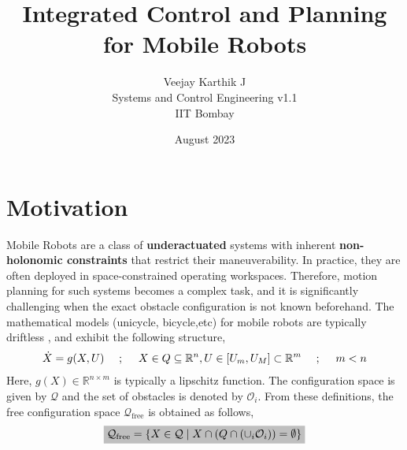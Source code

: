 \documentclass{article}
\begin{document}
\title{Integrated Control and Planning for Mobile Robots}
\author{Veejay Karthik J\\
Systems and Control Engineering v1.1\\
IIT Bombay}
\date{August 2023}


\maketitle

\section{Motivation}

Mobile Robots are a class of \textbf{underactuated} systems with inherent \textbf{non-holonomic constraints} that restrict their maneuverability. In practice, they are often deployed in space-constrained operating workspaces. Therefore, motion planning for such systems becomes a complex task, and it is significantly challenging when the exact obstacle configuration is not known beforehand. The mathematical models (unicycle, bicycle,etc) for mobile robots are typically driftless , and exhibit the following structure,
\begin{align}
\label{eqn:SystemDescription}
\centering
\dot{X} = g(X,U) \quad~;~\quad X \in Q \subseteq \mathbb{R}^n, U\in [U_m,U_M]\subset\mathbb{R}^m \quad~;~\quad m < n
\end{align}
Here, $g(X)\in \mathbb{R}^{n\times m}$ is typically a lipschitz function. The configuration space is given by $\mathcal{Q}$ and the set of obstacles is denoted by $\mathcal{O}_i$. From these definitions, the free configuration space $\mathcal{Q}_{\text{free}}$ is obtained as follows,
\begin{align}
\label{eqn:FreeWorkspaces}
\text{\colorbox{lightgray}{$\mathcal{Q}_{\text{free}} = \{X\in\mathcal{Q}\;|\; X\cap\left(Q\cap (\cup_i \mathcal{O}_i)\right) = \emptyset \}$}}
\end{align}
    
\end{document}
